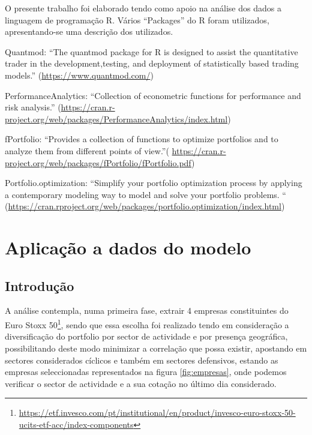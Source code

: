 \documentclass[
  12pt,
  a4paper,
  openany]{book}
\begin{document}
\newpage

O presente trabalho foi elaborado tendo como apoio na análise dos dados a linguagem de programação R.
Vários ``Packages'' do R foram utilizados, apresentando-se uma descrição dos utilizados.

Quantmod: ``The quantmod package for R is designed to assist the quantitative trader in the development,testing, and deployment of statistically based trading models.'' (\url{https://www.quantmod.com/})

PerformanceAnalytics: ``Collection of econometric functions for performance and risk analysis.''
(\url{https://cran.r-project.org/web/packages/PerformanceAnalytics/index.html})

fPortfolio: ``Provides a collection of functions to optimize portfolios and to analyze them from different points of view.''( \url{https://cran.r-project.org/web/packages/fPortfolio/fPortfolio.pdf})

Portfolio.optimization: ``Simplify your portfolio optimization process by applying a contemporary modeling way to model and solve your portfolio problems. `` (\url{https://cran.rproject.org/web/packages/portfolio.optimization/index.html})

\hypertarget{aplicauxe7uxe3o-a-dados-do-modelo}{%
\chapter{Aplicação a dados do modelo}\label{aplicauxe7uxe3o-a-dados-do-modelo}}

\endgroup
\newpage

\hypertarget{introduuxe7uxe3o}{%
\section{Introdução}\label{introduuxe7uxe3o}}

A análise contempla, numa primeira fase, extrair 4 empresas constituintes do Euro Stoxx 50\footnote{\url{https://etf.invesco.com/pt/institutional/en/product/invesco-euro-stoxx-50-ucits-etf-acc/index-components}}, sendo que essa escolha foi realizado tendo em consideração a diversificação do portfolio por sector de actividade e por presença geográfica, possibilitando deste modo minimizar a correlação que possa existir, apostando em sectores considerados cíclicos e também em sectores defensivos, estando as empresas seleccionadas representados na figura \ref{fig:empresas}, onde podemos verificar o sector de actividade e a sua cotação no último dia considerado.
\end{document}
